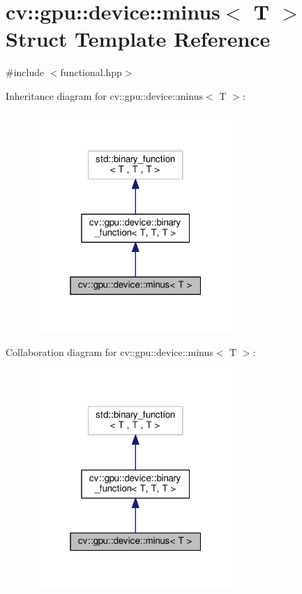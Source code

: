 \hypertarget{structcv_1_1gpu_1_1device_1_1minus}{\section{cv\-:\-:gpu\-:\-:device\-:\-:minus$<$ T $>$ Struct Template Reference}
\label{structcv_1_1gpu_1_1device_1_1minus}
}


{\ttfamily \#include $<$functional.\-hpp$>$}



Inheritance diagram for cv\-:\-:gpu\-:\-:device\-:\-:minus$<$ T $>$\-:\nopagebreak
\begin{figure}[H]
\begin{center}
\leavevmode
\includegraphics[width=220pt]{structcv_1_1gpu_1_1device_1_1minus__inherit__graph}
\end{center}
\end{figure}


Collaboration diagram for cv\-:\-:gpu\-:\-:device\-:\-:minus$<$ T $>$\-:\nopagebreak
\begin{figure}[H]
\begin{center}
\leavevmode
\includegraphics[width=220pt]{structcv_1_1gpu_1_1device_1_1minus__coll__graph}
\end{center}
\end{figure}
